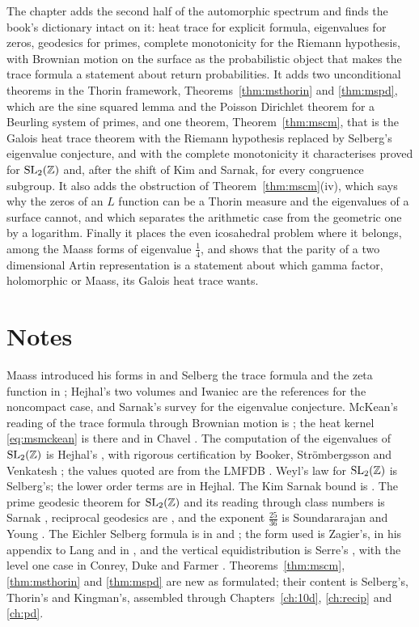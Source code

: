The chapter adds the second half of the automorphic spectrum and finds the book's dictionary intact on it: heat trace for explicit formula, eigenvalues for zeros, geodesics for primes, complete monotonicity for the Riemann hypothesis, with Brownian motion on the surface as the probabilistic object that makes the trace formula a statement about return probabilities. It adds two unconditional theorems in the Thorin framework, Theorems~\ref{thm:msthorin} and \ref{thm:mspd}, which are the sine squared lemma and the Poisson Dirichlet theorem for a Beurling system of primes, and one theorem, Theorem~\ref{thm:mscm}, that is the Galois heat trace theorem with the Riemann hypothesis replaced by Selberg's eigenvalue conjecture, and with the complete monotonicity it characterises proved for $\mathrm{SL}_2(\mathbb{Z})$ and, after the shift of Kim and Sarnak, for every congruence subgroup. It also adds the obstruction of Theorem~\ref{thm:mscm}(iv), which says why the zeros of an $L$ function can be a Thorin measure and the eigenvalues of a surface cannot, and which separates the arithmetic case from the geometric one by a logarithm. Finally it places the even icosahedral problem where it belongs, among the Maass forms of eigenvalue $\frac14$, and shows that the parity of a two dimensional Artin representation is a statement about which gamma factor, holomorphic or Maass, its Galois heat trace wants.

\section{Notes}

Maass introduced his forms in \cite{maass1949} and Selberg the trace formula and the zeta function in \cite{selberg1956}; Hejhal's two volumes \cite{hejhal1976,hejhal1983} and Iwaniec \cite{iwaniec2002} are the references for the noncompact case, and Sarnak's survey \cite{sarnak2003} for the eigenvalue conjecture. McKean's reading of the trace formula through Brownian motion is \cite{mckean1972}; the heat kernel \eqref{eq:msmckean} is there and in Chavel \cite{chavel1984}. The computation of the eigenvalues of $\mathrm{SL}_2(\mathbb{Z})$ is Hejhal's \cite{hejhal1992}, with rigorous certification by Booker, Str\"ombergsson and Venkatesh \cite{bookerstrombergssonvenkatesh2006}; the values quoted are from the LMFDB \cite{lmfdb}. Weyl's law for $\mathrm{SL}_2(\mathbb{Z})$ is Selberg's; the lower order terms are in Hejhal. The Kim Sarnak bound is \cite{kimsarnak2003}. The prime geodesic theorem for $\mathrm{SL}_2(\mathbb{Z})$ and its reading through class numbers is Sarnak \cite{sarnak1982}, reciprocal geodesics are \cite{sarnakreciprocal2007}, and the exponent $\frac{25}{36}$ is Soundararajan and Young \cite{soundararajanyoung2013}. The Eichler Selberg formula is in \cite{eichler1957} and \cite{selberg1956}; the form used is Zagier's, in his appendix to Lang \cite{lang1976} and in \cite{zagier1977}, and the vertical equidistribution is Serre's \cite{serre1997}, with the level one case in Conrey, Duke and Farmer \cite{cdf1997}. Theorems~\ref{thm:mscm}, \ref{thm:msthorin} and \ref{thm:mspd} are new as formulated; their content is Selberg's, Thorin's and Kingman's, assembled through Chapters~\ref{ch:10d}, \ref{ch:recip} and \ref{ch:pd}.

